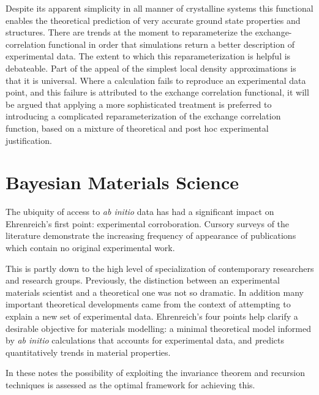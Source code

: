 Despite its apparent simplicity in all manner of crystalline systems 
this functional enables the theoretical
prediction of very accurate ground state properties and structures. 
There are trends at the moment to reparameterize the exchange-correlation functional
in order that simulations return a better description of experimental data. The extent
to which this reparameterization is helpful is debateable. Part of the appeal
of the simplest local density approximations is that it is universal. Where a calculation
fails to reproduce an experimental data point, and this failure is attributed to the
exchange correlation functional, it will be argued that applying a more sophisticated treatment
is preferred to introducing a complicated reparameterization of the exchange correlation
function, based on a mixture of theoretical and post hoc experimental 
justification.

\section{Bayesian Materials Science}
The ubiquity of access to {\it ab initio} data has had a significant impact on 
Ehrenreich's first point: experimental corroboration. 
Cursory surveys of the literature demonstrate the increasing frequency of 
appearance of publications which contain no original experimental work. 

This is partly down to the high level of specialization of contemporary 
researchers and research groups. Previously, the distinction between
an experimental materials scientist and a theoretical one was not so dramatic. 
In addition many important theoretical developments came 
from the context of attempting to explain a new set of experimental data.
Ehrenreich's four points help clarify a desirable objective for materials modelling:
a minimal theoretical model informed by {\it ab initio} calculations that accounts for 
experimental data, and {\emph predicts} quantitatively trends in material properties. 

In these notes the possibility of exploiting the invariance theorem 
and recursion techniques is assessed as the optimal framework
for achieving this. 

